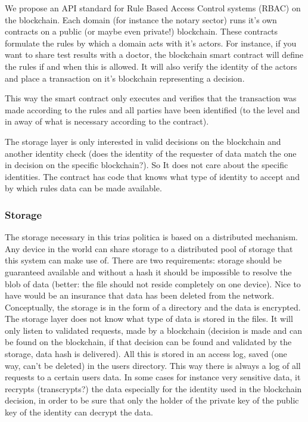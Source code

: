 \documentclass{article}
\begin{document}
We propose an API standard for Rule Based Access Control systems (RBAC) on the blockchain. Each domain (for instance the notary sector) runs it's own contracts on a public (or maybe even private!) blockchain. These contracts formulate the rules by which a domain acts with it's actors. For instance, if you want to share test results with a doctor, the blockchain smart contract will define the rules if and when this is allowed. It will also verify the identity of the actors and place a transaction on it's blockchain representing a decision.

This way the smart contract only executes and verifies that the transaction was made according to the rules and all parties have been identified (to the level and in away of what is necessary according to the contract).

The storage layer is only interested in valid decisions on the blockchain and another identity check (does the identity of the requester of data match the one in decision on the specific blockchain?). So It does not care about the specific identities. The contract has code that knows what type of identity to accept and by which rules data can be made available.

\subsubsection{Storage}
The storage necessary in this trias politica is based on a distributed mechanism. Any device in the world can share storage to a distributed pool of storage that this system can make use of. There are two requirements: storage should be guaranteed available and without a hash it should be impossible to resolve the blob of data (better: the file should not reside completely on one device). Nice to have would be an insurance that data has been deleted from the network. Conceptually, the storage is in the form of a directory and the data is encrypted. The storage layer does not know what type of data is stored in the files. It will only listen to validated requests, made by a blockchain (decision is made and can be found on the blockchain, if that decision can be found and validated by the storage, data hash is delivered). All this is stored in an access log, saved (one way, can't be deleted) in the users directory. This way there is always a log of all requests to a certain users data. In some cases for instance very sensitive data, it recrypts (transcrypts?) the data especially for the identity used in the blockchain decision, in order to be sure that only the holder of the private key of the public key of the identity can decrypt the data.
\end{document}
